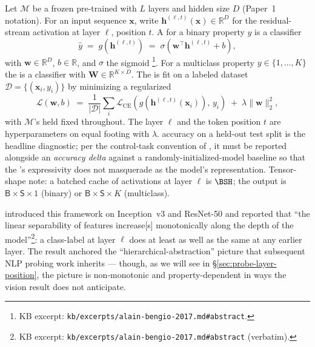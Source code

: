 Let $\mathcal{M}$ be a frozen pre-trained  with $L$ layers and
hidden size $D$ (Paper~1 notation). For an input sequence $\mathbf{x}$,
write $\mathbf{h}^{(\ell, t)}(\mathbf{x}) \in \mathbb{R}^D$ for the
residual-stream activation at layer $\ell$, position $t$. A
\emph{} for a binary property $y$ is a classifier
\begin{equation}
  \hat y \;=\; g(\mathbf{h}^{(\ell, t)})
  \;=\; \sigma\!\left(\mathbf{w}^\top \mathbf{h}^{(\ell, t)} + b\right),
  \label{eq:linear-probe}
\end{equation}
with $\mathbf{w} \in \mathbb{R}^D$, $b \in \mathbb{R}$, and $\sigma$ the
sigmoid \citep{alain-bengio-2017}\footnote{KB excerpt:
\nolinkurl{kb/excerpts/alain-bengio-2017.md#abstract}.}. For a
multiclass property $y \in \{1, \dots, K\}$ the  is a 
classifier with $\mathbf{W} \in \mathbb{R}^{K \times D}$. The  is
fit on a labeled dataset
$\mathcal{D} = \{(\mathbf{x}_i, y_i)\}$ by minimizing a regularized
\begin{equation}
  \mathcal{L}(\mathbf{w}, b)
  \;=\; \frac{1}{|\mathcal{D}|}\sum_{i}\mathcal{L}_{\mathrm{CE}}\!\left(g(\mathbf{h}^{(\ell, t)}(\mathbf{x}_i)),\, y_i\right)
  \;+\; \lambda \|\mathbf{w}\|_2^2,
  \label{eq:probe-loss}
\end{equation}
with $\mathcal{M}$'s  held fixed throughout. The layer $\ell$
and the token position $t$ are hyperparameters on equal footing with
$\lambda$.  accuracy on a held-out test split is the headline
diagnostic; per the control-task convention of
\citet{hewitt2019-control-tasks}, it must be reported alongside an
\emph{accuracy delta} against a randomly-initialized-model baseline so
that the 's expressivity does not masquerade as the model's
representation. Tensor-shape note: a batched cache of activations at
layer $\ell$ is $\BSH$; the 
output is $\mathsf{B}\!\times\!\mathsf{S}\!\times\!1$ (binary) or
$\mathsf{B}\!\times\!\mathsf{S}\!\times\!K$ (multiclass).

\citet{alain-bengio-2017} introduced this framework on Inception~v3 and
ResNet-50 and reported that ``the linear separability of features
increase[s] monotonically along the depth of the
model''\footnote{KB excerpt: \nolinkurl{kb/excerpts/alain-bengio-2017.md#abstract}
(verbatim).}: a class-label  at layer $\ell$ does at least as well
as the same  at any earlier layer. The result anchored the
``hierarchical-abstraction'' picture that subsequent NLP probing work
inherits — though, as we will see in \S\ref{sec:probe-layer-position},
the  picture is non-monotonic and property-dependent in ways the
vision result does not anticipate.

